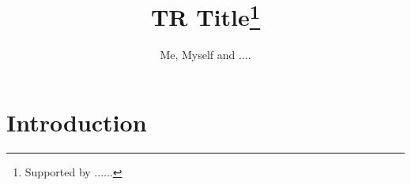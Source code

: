 \documentclass[12pt]{article}
\title{TR Title\thanks{Supported by  ......}  }
\author{Me, Myself and ....}
\begin{document}


\maketitle

\section{Introduction}\label{sec:intro}

\cite{PTR-Hubmer07a}


 

\end{document}
